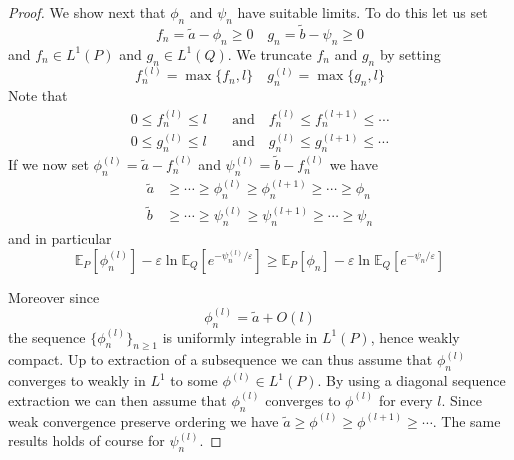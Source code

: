 \documentclass{amsart}
\theoremstyle{definition}
\theoremstyle{remark}
\numberwithin{equation}{section}
\begin{document}
\begin{proof}
We show next that $\phi_n$ and $\psi_n$ have suitable limits. To do this let us set 
\begin{equation}
f_n = \tilde{a} - \phi_n \ge 0 \quad g_n = \tilde{b} -\psi_n \ge 0
\end{equation}
and $f_n \in L^1(P)$ and $g_n \in L^1(Q)$.  We truncate $f_n$ and $g_n$ by setting 
\begin{equation}
f_n^{(l)}= \max \{ f_n, l\} \quad  g_n^{(l)}= \max \{ g_n, l\} 
\end{equation}
Note that 
\begin{equation}
\begin{aligned}
0\le f_n^{(l)} \le l & \quad 
\text {and} \quad  f_n^{(l)} \le f_n^{(l+1)} \le \cdots \\
0\le g_n^{(l)} \le l & \quad 
\text {and} \quad g_n^{(l)} \le g_n^{(l+1)} \le \cdots 
\end{aligned}
\end{equation}
If we now set 
$\phi_n^{(l)} = \tilde{a} - f_{n}^{(l)}$ and  
$\psi_n^{(l)} = \tilde{b} - f_{n}^{(l)}$ we have 
\begin{equation}
\begin{aligned}
\tilde{a} &\ge \cdots \ge \phi_n^{(l)}\ge \phi_n^{(l+1)} \ge \cdots \ge \phi_n
\\
\tilde{b} &\ge \cdots \ge  \psi_n^{(l)}\ge \psi_n^{(l+1)} \ge \cdots \ge \psi_n
\end{aligned}
\end{equation}
and in particular
\begin{equation}\label{eq:mon}
\mathbb{E}_P[\phi_n^{(l)}] - \varepsilon \ln \mathbb{E}_Q[e^{-\psi_n^{(l)}/\varepsilon}]
\ge \mathbb{E}_P[\phi_n] - \varepsilon \ln \mathbb{E}_Q[e^{-\psi_n/\varepsilon}]
\end{equation}


Moreover since 
\begin{equation}
\phi_n^{(l)}= \tilde{a} + O(l)
\end{equation}
the sequence $\{\phi_n^{(l)}\}_{n \ge 1}$ is uniformly integrable in $L^1(P)$, hence weakly compact.  Up to extraction of a subsequence we can thus assume that $\phi_n^{(l)}$ converges to weakly in $L^1$ to some $\phi^{(l)}\in L^1(P)$.  By using a diagonal sequence extraction we can then assume that $\phi_n^{(l)}$ converges to $\phi^{(l)}$ for every $l$. Since weak convergence preserve ordering  we have $\tilde{a} \ge \phi^{(l)}\ge \phi^{(l+1)} \ge \cdots$.   
The same results holds of course for $\psi_n^{(l)}$.  


\end{proof}
\end{document}
